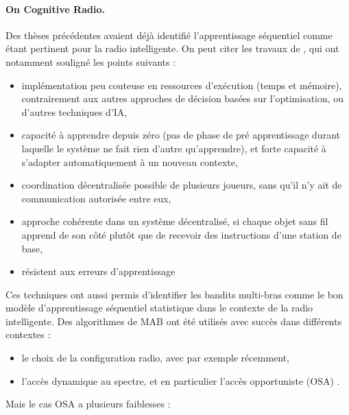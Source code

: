 \hline{}
\newpage


\paragraph{On Cognitive Radio.}

Des thèses précédentes avaient déjà identifié l'apprentissage séquentiel comme étant pertinent pour la radio intelligente.
On peut citer les travaux de \cite{Jouini09,Jouini10,Jouini12}, qui ont notamment souligné les points suivants :

\begin{itemize}
    \item implémentation peu couteuse en ressources d'exécution (temps et mémoire), contrairement aux autres approches de décision basées sur l'optimisation, ou d'autres techniques d'IA,
    \item capacité à apprendre depuis zéro (pas de phase de pré apprentissage durant laquelle le système ne fait rien d'autre qu'apprendre), et forte capacité à s'adapter automatiquement à un nouveau contexte,
    \item coordination décentralisée possible de plusieurs joueurs, sans qu'il n'y ait de communication autorisée entre eux,
    \item approche cohérente dans un système décentralisé, si chaque objet sans fil apprend de son côté plutôt que de recevoir des instructions d'une station de base,
    \item résistent aux erreurs d'apprentissage
\end{itemize}

Ces techniques ont aussi permis d'identifier les bandits multi-bras comme le bon modèle d'apprentissage séquentiel statistique dans le contexte de la radio intelligente.
Des algorithmes de MAB ont été utilisés avec succès dans différents contextes :

\begin{itemize}
    \item le choix de la configuration radio, avec par exemple \cite{KerkoucheAlami18} récemment,
    \item l'accès dynamique au spectre, et en particulier l'accès opportuniste (OSA) \cite{Jouini09}.
\end{itemize}

Mais le cas OSA a plusieurs faiblesses :

